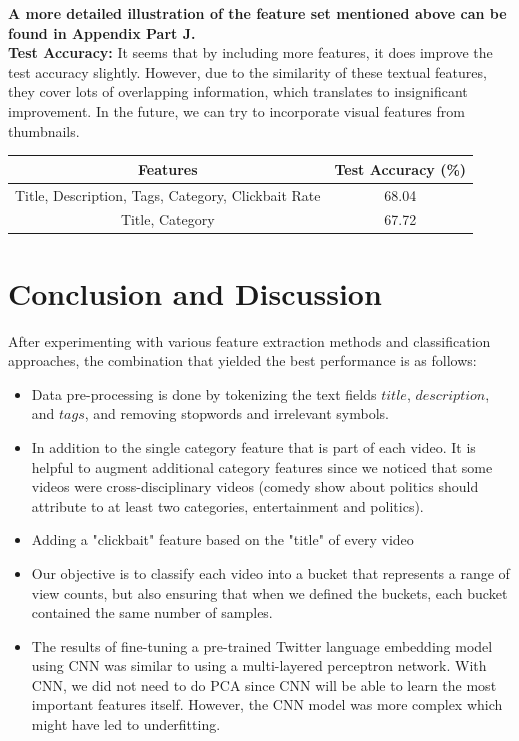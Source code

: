 \documentclass[english]{article}
\begin{document}
\noindent \textbf{A more detailed illustration of the feature set mentioned above can be found in Appendix Part J.}  \\


\noindent \textbf{Test Accuracy:} It seems that by including more features, it does improve the test accuracy slightly. However, due to the similarity of these textual features, they cover lots of overlapping information, which translates to insignificant improvement. In the future, we can try to incorporate visual features from thumbnails. \\

\begin{table}[H]
\centering
\begin{tabular}{ *2c } 
 \toprule
 \textbf{Features} & \textbf{Test Accuracy (\%)}\\
 \midrule
 Title, Description, Tags, Category, Clickbait Rate & 68.04 \\
 Title, Category & 67.72 \\
 \bottomrule
\end{tabular}
\label{nnOA}
\end{table}


\section{Conclusion and Discussion}

After experimenting with various feature extraction methods and classification approaches, the combination that yielded the best performance is as follows:

\begin{itemize}
    \item Data pre-processing is done by tokenizing the text fields $title$, $description$, and $tags$, and removing stopwords and irrelevant symbols.
    \item In addition to the single category feature that is part of each video. It is helpful to augment additional category features since we noticed that some videos were cross-disciplinary videos (comedy show about politics should attribute to at least two categories, entertainment and politics).
    \item Adding a "clickbait" feature based on the "title" of every video
    \item Our objective is to classify each video into a bucket that represents a range of view counts, but also ensuring that when we defined the buckets, each bucket contained the same number of samples.
    \item The results of fine-tuning a pre-trained Twitter language embedding model using CNN was similar to using a multi-layered perceptron network. With CNN, we did not need to do PCA since CNN will be able to learn the most important features itself. However, the CNN model was more complex which might have led to underfitting. 
    
\end{itemize}
\end{document}
